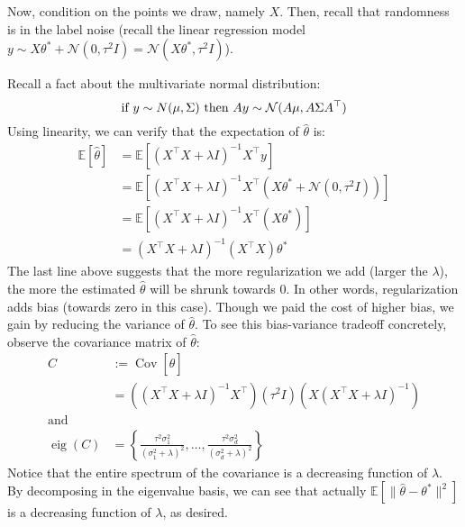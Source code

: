 Now, condition on the points we draw, namely $X$. Then, recall that
randomness is in the label noise (recall the linear regression model $y \sim X\theta^* + \mathcal N(0,\tau^2 I) = \mathcal N(X\theta^* ,\tau^2 I)$).

Recall a fact about the multivariate normal distribution:
\begin{equation}
    \text{if } y \sim \mathcal \mathcal N(\mu,\Sigma) \text{ then } Ay \sim \mathcal N(A\mu,A\Sigma A^\top)
\end{equation}
Using linearity, we can verify that the expectation of $\hat{\theta}$ is:
\begin{align}
    \mathbb E[\hat{\theta}] &= \mathbb E\left[(X^\top X + \lambda I)^{-1} X^\top y\right]\\
        &= \mathbb E\left[(X^\top X + \lambda I)^{-1} X^\top (X\theta^* + \mathcal N(0,\tau^2 I))\right]\\ %
        &= \mathbb E\left[(X^\top X + \lambda I)^{-1} X^\top (X\theta^* )\right]\\
        &= (X^\top X + \lambda I)^{-1} (X^\top X)\theta^* \tag{essentially a ``shrunk'' $\theta^*$}    
\end{align}
The last line above suggests that the more regularization we add (larger the $\lambda$),
the more the estimated $\hat{\theta}$ will be shrunk towards $0$. In other words,
regularization adds bias (towards zero in this case). Though we paid the cost of higher
bias, we gain by reducing the variance of
$\hat{\theta}$. To see this bias-variance tradeoff
concretely, observe the covariance matrix of $\hat{\theta}$:
\begin{align}
    C &:= \operatorname{Cov}[\hat{\theta}]\\
        &= \left( (X^\top X + \lambda I)^{-1} X^\top \right) (\tau^2 I) \left( X(X^\top X + \lambda I)^{-1} \right)\\
\text{and}&\nonumber\\
\operatorname{eig}(C) &= \left\{ \frac{\tau^2 \sigma^2_1}{(\sigma^2_1 + \lambda)^2}, \ldots, \frac{\tau^2 \sigma^2_d}{(\sigma^2_d + \lambda)^2}\right\}
\end{align}
Notice that the entire spectrum of the covariance is a decreasing function of $\lambda$.
By decomposing in the eigenvalue basis, we can see that actually $\mathbb E\left[\lVert \hat{\theta} - \theta^* \rVert^2 \right]$ is a decreasing function of $\lambda$, as desired.

